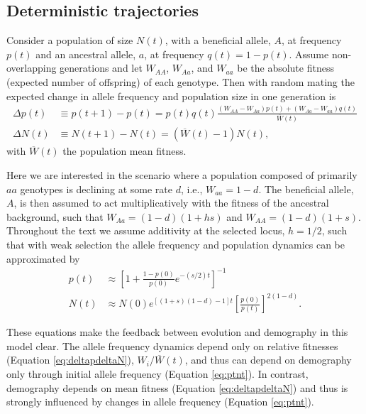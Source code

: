 \documentclass[]{article}
\begin{document}
\subsection*{Deterministic trajectories}
\label{sec:rescue_forward}

Consider a population of size $N(t)$, with a beneficial allele, $A$, at frequency $p(t)$ and an ancestral allele, $a$, at frequency $q(t)=1-p(t)$.
Assume non-overlapping generations and let $W_{AA}$, $W_{Aa}$, and $W_{aa}$ be the absolute fitness (expected number of offspring) of each genotype.
Then with random mating the expected change in allele frequency \citep[equation 5.2.13 in][]{crow1970introduction} and population size in one generation is
\begin{equation}\label{eq:deltapdeltaN}
\begin{aligned}
\Delta p(t) &\equiv p(t+1) - p(t) = p(t) q(t) \frac{  (W_{AA} - W_{Aa} )p(t) +  (W_{Aa} - W_{aa})q(t)}{\overline{W}(t)}  \\
\Delta N(t) &\equiv N(t+1) - N(t) = (\overline{W}(t) - 1) N(t),
\end{aligned}
\end{equation}
with $\overline{W}(t)$ the population mean fitness.

Here we are interested in the scenario where a population composed of primarily $aa$ genotypes is declining at some rate $d$, i.e., $W_{aa} = 1-d$.
The beneficial allele, $A$, is then assumed to act multiplicatively with the fitness of the ancestral background, such that $W_{Aa} = (1-d)(1+ h s)$ and $W_{AA} = (1-d)(1+s)$.
Throughout the text we assume additivity at the selected locus, $h=1/2$, such that with weak selection the allele frequency \citep[c.f., equation 5.3.12 in][]{crow1970introduction} and population dynamics can be approximated by
\begin{equation}\label{eq:ptnt}
\begin{aligned}
p(t) &\approx \left[ 1 + \frac{1-p(0)}{p(0)} e^{-(s/2)t} \right]^{-1}\\
N(t) &\approx N(0) e^{ \left[ (1+s)(1-d)-1\right]t} \left[\frac{p(0)}{p(t)} \right]^{2(1-d)}.
\end{aligned}
\end{equation}

These equations make the feedback between evolution and demography in this model clear.
The allele frequency dynamics depend only on relative fitnesses (Equation \ref{eq:deltapdeltaN}), $W_i/\overline{W}(t)$, and thus can depend on demography only through initial allele frequency (Equation \ref{eq:ptnt}).
In contrast, demography depends on mean fitness (Equation \ref{eq:deltapdeltaN}) and thus is strongly influenced by changes in allele frequency (Equation \ref{eq:ptnt}).
\end{document}
